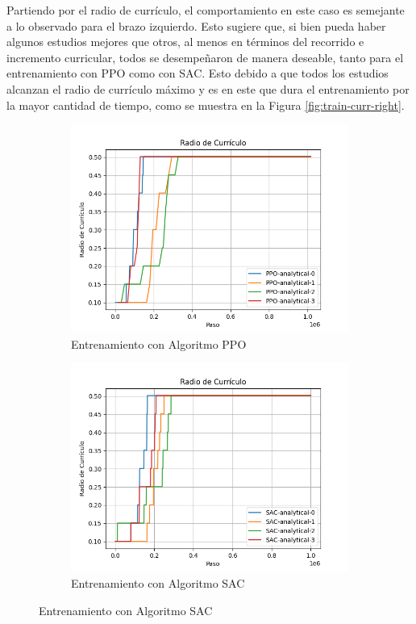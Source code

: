 Partiendo por el radio de currículo, el comportamiento en este caso es semejante a lo observado para el brazo izquierdo. Esto sugiere que, si bien pueda haber algunos estudios mejores que otros, al menos en términos del recorrido e incremento curricular, todos se desempeñaron de manera deseable, tanto para el entrenamiento con PPO como con SAC. Esto debido a que todos los estudios alcanzan el radio de currículo máximo y es en este que dura el entrenamiento por la mayor cantidad de tiempo, como se muestra en la Figura \ref{fig:train-curr-right}.\\

\begin{figure}[h!]
	\centering
	
	\begin{subfigure}[b]{0.48\textwidth}
		\centering
		\includegraphics[width=\textwidth]{images/graphs/PPO/Right/curriculum_radius}
		\caption{Entrenamiento con Algoritmo PPO}
		\label{fig:train-ppo-curr-right}
	\end{subfigure}
	\hfill
	\begin{subfigure}[b]{0.48\textwidth}
		\centering
		\includegraphics[width=\textwidth]{images/graphs/SAC/Right/curriculum_radius}
		\caption{Entrenamiento con Algoritmo SAC}
		\label{fig:train-sac-curr-right}
	\end{subfigure}
	

\end{figure}
